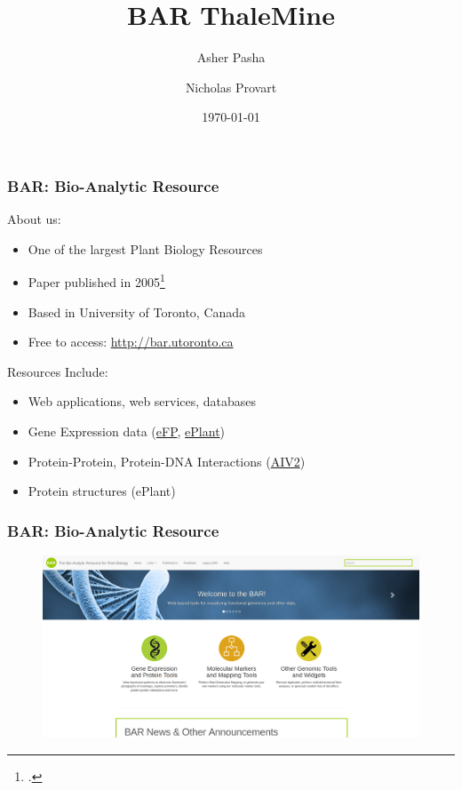 \documentclass{beamer}
\begin{document}
\title[BAR ThaleMine] 
{BAR ThaleMine}
\author[Pasha, Provart]{Asher Pasha \and Nicholas Provart}
\date{\today}

\frame{\titlepage}

\begin{frame}
    \frametitle{BAR: Bio-Analytic Resource}
    About us:
    \begin{itemize}
        \item One of the largest Plant Biology Resources
        \item Paper published in 2005\footcite{bar2005}
        \item Based in University of Toronto, Canada
        \item Free to access: \href{http://bar.utoronto.ca}{http://bar.utoronto.ca}
    \end{itemize}
    Resources Include:
    \begin{itemize}
        \item Web applications, web services, databases
        \item Gene Expression data (\href{http://bar.utoronto.ca/efp}{eFP}, \href{http://bar.utoronto.ca/eplant}{ePlant})
        \item Protein-Protein, Protein-DNA Interactions (\href{http://bar.utoronto.ca/interactions2}{AIV2})
        \item Protein structures (ePlant)
    \end{itemize}
\end{frame}

\begin{frame}
    \frametitle{BAR: Bio-Analytic Resource}
    \begin{figure}[H]
        \centering
        \includegraphics[width=\columnwidth]{img/BAR.png}
    \end{figure}
\end{frame}
\end{document}
